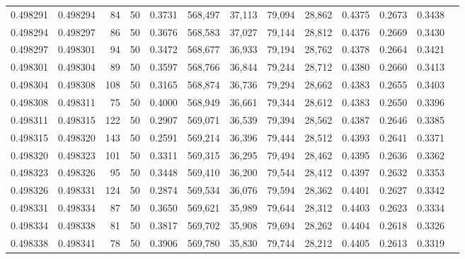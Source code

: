 \begin{tabular}{rrrrrrrrrrrrr}
0.498291 & 0.498294 &    84 &  50 &                                     0.3731 & 568,497 &  37,113 &  79,094 &  28,862 & 0.4375 & 0.2673 & 0.3438 \\
0.498294 & 0.498297 &    86 &  50 &                                     0.3676 & 568,583 &  37,027 &  79,144 &  28,812 & 0.4376 & 0.2669 & 0.3430 \\
0.498297 & 0.498301 &    94 &  50 &                                     0.3472 & 568,677 &  36,933 &  79,194 &  28,762 & 0.4378 & 0.2664 & 0.3421 \\
0.498301 & 0.498304 &    89 &  50 &                                     0.3597 & 568,766 &  36,844 &  79,244 &  28,712 & 0.4380 & 0.2660 & 0.3413 \\
0.498304 & 0.498308 &   108 &  50 &                                     0.3165 & 568,874 &  36,736 &  79,294 &  28,662 & 0.4383 & 0.2655 & 0.3403 \\
0.498308 & 0.498311 &    75 &  50 &                                     0.4000 & 568,949 &  36,661 &  79,344 &  28,612 & 0.4383 & 0.2650 & 0.3396 \\
0.498311 & 0.498315 &   122 &  50 &                                     0.2907 & 569,071 &  36,539 &  79,394 &  28,562 & 0.4387 & 0.2646 & 0.3385 \\
0.498315 & 0.498320 &   143 &  50 &                                     0.2591 & 569,214 &  36,396 &  79,444 &  28,512 & 0.4393 & 0.2641 & 0.3371 \\
0.498320 & 0.498323 &   101 &  50 &                                     0.3311 & 569,315 &  36,295 &  79,494 &  28,462 & 0.4395 & 0.2636 & 0.3362 \\
0.498323 & 0.498326 &    95 &  50 &                                     0.3448 & 569,410 &  36,200 &  79,544 &  28,412 & 0.4397 & 0.2632 & 0.3353 \\
0.498326 & 0.498331 &   124 &  50 &                                     0.2874 & 569,534 &  36,076 &  79,594 &  28,362 & 0.4401 & 0.2627 & 0.3342 \\
0.498331 & 0.498334 &    87 &  50 &                                     0.3650 & 569,621 &  35,989 &  79,644 &  28,312 & 0.4403 & 0.2623 & 0.3334 \\
0.498334 & 0.498338 &    81 &  50 &                                     0.3817 & 569,702 &  35,908 &  79,694 &  28,262 & 0.4404 & 0.2618 & 0.3326 \\
0.498338 & 0.498341 &    78 &  50 &                                     0.3906 & 569,780 &  35,830 &  79,744 &  28,212 & 0.4405 & 0.2613 & 0.3319 \\

\end{tabular}
